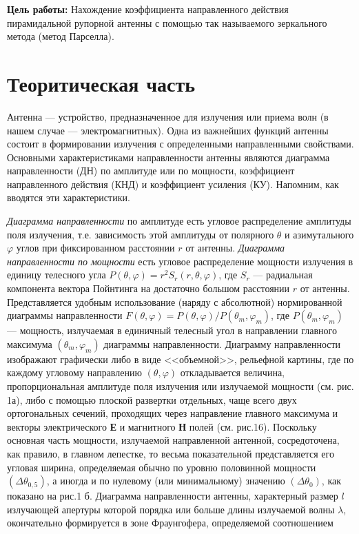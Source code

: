 



\def\labauthors{Виноградов И.Д., Шиков А.П.}
\def\labgroup{430}
\def\labnumber{7}
\def\labtheme{Определение коэффициента направленного действия рупорной антенны}


\newpage

{\bfseries Цель работы:} 
Нахождение коэффициента направленного действия пирамидальной рупорной антенны с помощью так называемого зеркального
метода (метод Парселла).

\section{Теоритическая часть}

Антенна — устройство, предназначенное для излучения или приема волн (в нашем случае — электромагнитных). Одна из
важнейших функций антенны состоит в формировании излучения с определенными направленными свойствами. Основными
характеристиками направленности антенны являются диаграмма направленности (ДН) по амплитуде или по мощности, коэффициент
 направленного действия (КНД) и коэффициент усиления (КУ). Напомним, как вводятся эти характеристики.

\textit{Диаграмма направленности} по амплитуде есть угловое распределение амплитуды поля излучения, т.е. зависимость этой
амплитуды от полярного $\theta $ и азимутального $ \varphi $ углов при фиксированном расстоянии $r$ от антенны. \textit{Диаграмма направленности
по мощности} есть угловое распределение мощности излучения в единицу телесного угла $P(\theta, \varphi)=r^{2} S_{r}(r, \theta, \varphi)$,
где $S_{r}$ — радиальная компонента вектора Пойнтинга на достаточно большом расстоянии $r$ от антенны. Представляется 
удобным использование (наряду с абсолютной) нормированной диаграммы направленности $F(\theta,\varphi) = P(\theta,\varphi)/P(\theta_m,\varphi_m)$,
где $P(\theta_m,\varphi_m)$ — мощность, излучаемая в единичный телесный угол в направлении главного максимума $(\theta_m,\varphi_m)$ диаграммы
направленности. Диаграмму направленности изображают графически либо в виде <<объемной>>, рельефной картины, где по
каждому угловому направлению $(\theta,\varphi)$ откладывается величина, пропорциональная амплитуде поля излучения или излучаемой 
мощности (см. рис. 1а), либо с помощью плоской развертки отдельных, чаще всего двух ортогональных сечений, проходящих 
через направление главного максимума и векторы электрического \textbf{Е} и магнитного \textbf{Н} полей (см. рис.16). Поскольку основная
часть мощности, излучаемой направленной антенной, сосредоточена, как правило, в главном лепестке, то весьма показательной
представляется его угловая ширина, определяемая обычно по уровню половинной мощности $ \left(\Delta \theta_{0,5}\right) $, а иногда и по нулевому (или минимальному) значению
$ \left(\Delta \theta_{0}\right) $, как показано на рис.1 б. Диаграмма направленности антенны, характерный размер $l$
излучающей апертуры которой порядка или больше длины излучаемой волны $\lambda$, окончательно формируется в зоне Фраунгофера,
определяемой соотношением 

